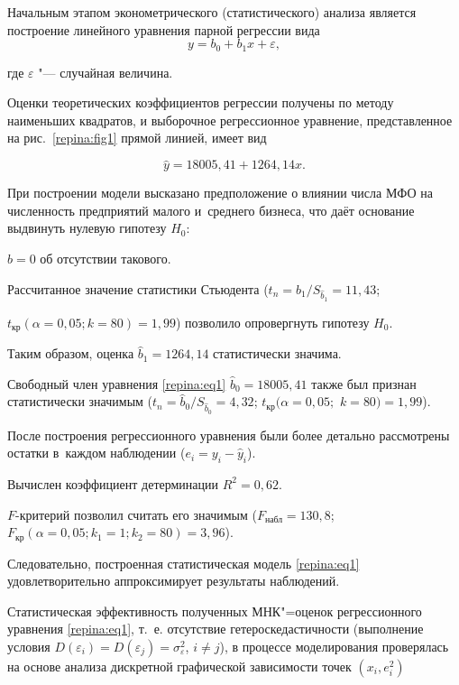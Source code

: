 Начальным этапом эконометрического (статистического) анализа является построение линейного уравнения парной регрессии вида $$y=b_0+b_1x+\varepsilon,$$ 

где $\varepsilon$ "--- случайная величина. 

Оценки теоретических коэффициентов регрессии получены по методу наименьших квадратов, и выборочное регрессионное уравнение, представленное на рис.~\ref{repina:fig1} прямой линией, имеет вид

\begin{equation}

\label{repina:eq1}

\hat{y}=18005,41+1264,14x.

\end{equation}



При построении модели высказано предположение о влиянии числа МФО на численность предприятий малого и~среднего бизнеса, что даёт основание выдвинуть нулевую гипотезу $H_0$: 

$b=0$ об отсутствии такового.

Рассчитанное значение статистики Стьюдента ($t_n=\hat{b}_1/S_{\hat{b}_1}=11,43$;

$t_{\text{кр}}({\alpha=0,05}; {k=80})=1,99$) позволило опровергнуть гипотезу $H_0$.

Таким образом, оценка $\hat{b}_1=1264,14$ статистически значима. 

Свободный член уравнения \eqref{repina:eq1} $\hat{b}_0=18005,41$ также был признан статистически значимым ($t_n=\hat{b}_0/S_{\hat{b}_0}=4,32$; $t_{\text{кр}}({\alpha=0,05};$ $ {k=80})=1,99$).



После построения регрессионного уравнения были  более детально рассмотрены остатки в~каждом наблюдении ($e_i=y_i-\hat{y}_i$). 

Вычислен коэффициент детерминации $R^2=0,62$. 

$F$-критерий позволил считать его значимым ($F_\text{набл}= 130,8$; $F_\text{кр}(\alpha=0,05; k_1=1; k_2=80)=3,96$). 

Следовательно, построенная статистическая модель \eqref{repina:eq1} удовлетворительно аппроксимирует результаты наблюдений.



Статистическая эффективность полученных МНК"=оценок регрессионного уравнения \eqref{repina:eq1}, т.~е. отсутствие гетероскедастичности (выполнение условия $D(\varepsilon_i)=D(\varepsilon_j)=\sigma^2_\varepsilon$, $i\neq j$), в процессе моделирования проверялась на основе анализа дискретной графической зависимости точек $(x_i, e^2_i)$

